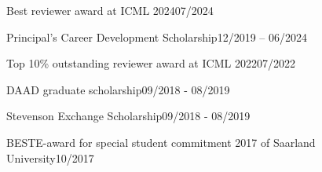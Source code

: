 \documentclass[]{lukas-cv-openfont}
\begin{document}


\noindent
\begin{tightitemize}{1.0em}
    \item Best reviewer award at ICML 2024\hfill 07/2024
    \item Principal's Career Development Scholarship\hfill 12/2019 -- 06/2024
    \item Top 10\% outstanding reviewer award at ICML 2022\hfill 07/2022
    \item DAAD graduate scholarship\hfill 09/2018 - 08/2019
    \item Stevenson Exchange Scholarship\hfill 09/2018 - 08/2019
    \item BESTE-award for special student commitment 2017 of Saarland University\hfill 10/2017
\end{tightitemize}
\sectionsep


\end{document}
